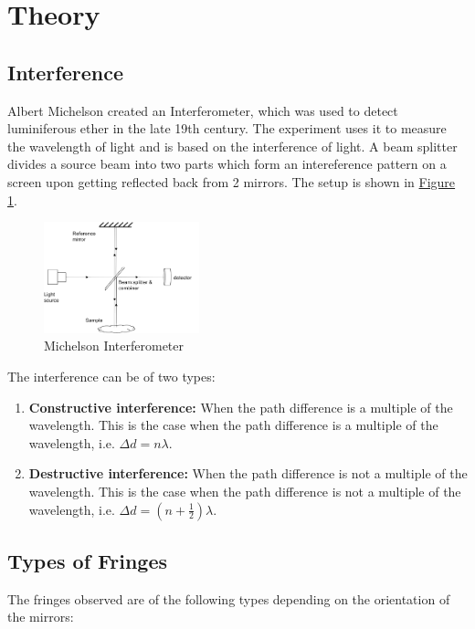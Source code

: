 \section{Theory}

	\subsection{Interference}

	Albert Michelson created an Interferometer, which was used to detect luminiferous ether in the late 19th century. The experiment uses it to measure the wavelength of light and is based on the interference of light. A beam splitter divides a source beam into two parts which form an intereference pattern on a screen upon getting reflected back from 2 mirrors. The setup is shown in \hyperref[fig:1]{Figure 1}.

		\begin{figure}[H]
			\centering
			\includegraphics[width=0.4\textwidth]{images/michelson_interferometer.png}
			\caption{Michelson Interferometer}
			\label{fig:1}
		\end{figure}

		The interference can be of two types:

		\begin{enumerate}
			\item \textbf{Constructive interference:} When the path difference is a multiple of the wavelength. This is the case when the path difference is a multiple of the wavelength, i.e. $\Delta d = n\lambda$.
			\item \textbf{Destructive interference:} When the path difference is not a multiple of the wavelength. This is the case when the path difference is not a multiple of the wavelength, i.e. $\Delta d = (n + \frac{1}{2})\lambda$.
		\end{enumerate}

	\subsection{Types of Fringes}
		
		The fringes observed are of the following types depending on the orientation of the mirrors:

